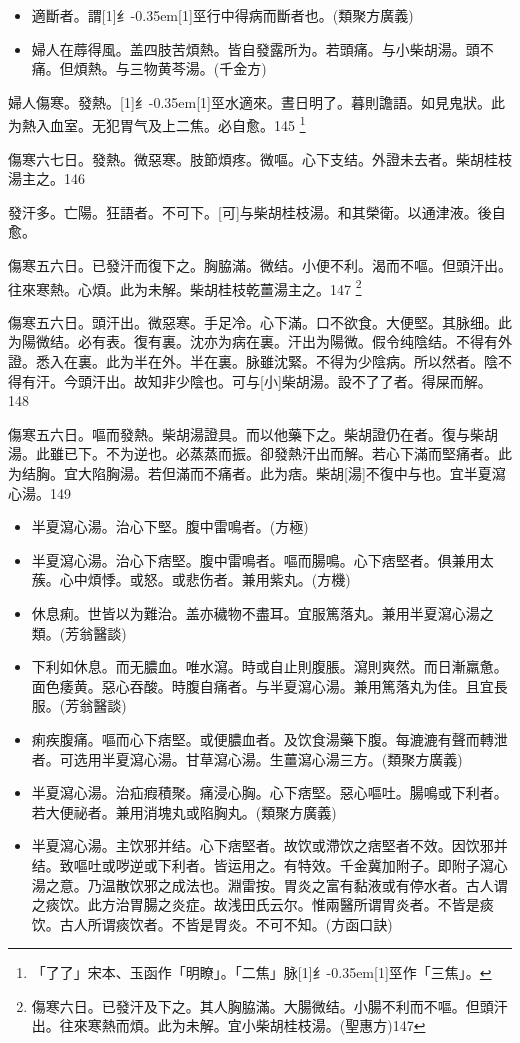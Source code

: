\documentclass[oneside,b4paper]{ctexbook}
\begin{document}
\begin{flushleft}
\begin{itemize}
\item 適斷者。謂{\hbox{\scalebox{0.68}[1]{纟}\kern-0.35em\scalebox{0.64}[1]{巠}}}行中得病而斷者也。(類聚方廣義)
\item 婦人在蓐得風。盖四肢苦煩熱。皆自發露所为。若頭痛。与小柴胡湯。頭不痛。但煩熱。与三物黄芩湯。(千金方)
\end{itemize}

婦人傷寒。發熱。{\hbox{\scalebox{0.68}[1]{纟}\kern-0.35em\scalebox{0.64}[1]{巠}}}水適來。晝日明了。暮則譫語。如見鬼狀。此为熱入血室。无犯胃气及上二焦。必自愈。145
\footnote{「了了」宋本、玉函作「明瞭」。「二焦」脉{\hbox{\scalebox{0.68}[1]{纟}\kern-0.35em\scalebox{0.64}[1]{巠}}}作「三焦」。}

傷寒六七日。發熱。微惡寒。肢節煩疼。微嘔。心下支结。外證未去者。柴胡桂枝湯主之。146

發汗多。亡陽。狂語者。不可下。[可]与柴胡桂枝湯。和其榮衛。以通津液。後自愈。

傷寒五六日。已發汗而復下之。胸脇滿。微结。小便不利。渴而不嘔。但頭汗出。往來寒熱。心煩。此为未解。柴胡桂枝乾薑湯主之。147
\footnote{傷寒六日。已發汗及下之。其人胸脇滿。大腸微结。小腸不利而不嘔。但頭汗出。往來寒熱而煩。此为未解。宜小柴胡桂枝湯。(聖惠方)147}

傷寒五六日。頭汗出。微惡寒。手足冷。心下滿。口不欲食。大便堅。其脉细。此为陽微结。必有表。復有裏。沈亦为病在裏。汗出为陽微。假令纯陰结。不得有外證。悉入在裏。此为半在外。半在裏。脉雖沈緊。不得为少陰病。所以然者。陰不得有汗。今頭汗出。故知非少陰也。可与[小]柴胡湯。設不了了者。得屎而解。148

傷寒五六日。嘔而發熱。柴胡湯證具。而以他藥下之。柴胡證仍在者。復与柴胡湯。此雖已下。不为逆也。必蒸蒸而振。卻發熱汗出而解。若心下滿而堅痛者。此为结胸。宜大陷胸湯。若但滿而不痛者。此为痞。柴胡[湯]不復中与也。宜半夏瀉心湯。149

\begin{itemize}
\item 半夏瀉心湯。治心下堅。腹中雷鳴者。(方極)
\item 半夏瀉心湯。治心下痞堅。腹中雷鳴者。嘔而腸鳴。心下痞堅者。俱兼用太蔟。心中煩悸。或怒。或悲伤者。兼用紫丸。(方機)
\item 休息痢。世皆以为難治。盖亦穢物不盡耳。宜服篤落丸。兼用半夏瀉心湯之類。(芳翁醫談)
\item 下利如休息。而无膿血。唯水瀉。時或自止則腹脹。瀉則爽然。而日漸羸惫。面色痿黄。惡心吞酸。時腹自痛者。与半夏瀉心湯。兼用篤落丸为佳。且宜長服。(芳翁醫談)
\item 痢疾腹痛。嘔而心下痞堅。或便膿血者。及饮食湯藥下腹。每漉漉有聲而轉泄者。可选用半夏瀉心湯。甘草瀉心湯。生薑瀉心湯三方。(類聚方廣義)
\item 半夏瀉心湯。治疝瘕積聚。痛浸心胸。心下痞堅。惡心嘔吐。腸鳴或下利者。若大便祕者。兼用消塊丸或陷胸丸。(類聚方廣義)
\item 半夏瀉心湯。主饮邪并结。心下痞堅者。故饮或滯饮之痞堅者不效。因饮邪并结。致嘔吐或哕逆或下利者。皆运用之。有特效。千金冀加附子。即附子瀉心湯之意。乃温散饮邪之成法也。淵雷按。胃炎之富有黏液或有停水者。古人谓之痰饮。此方治胃腸之炎症。故浅田氏云尔。惟兩醫所谓胃炎者。不皆是痰饮。古人所谓痰饮者。不皆是胃炎。不可不知。(方函口訣)
\end{itemize}


\end{flushleft}
\end{document}
